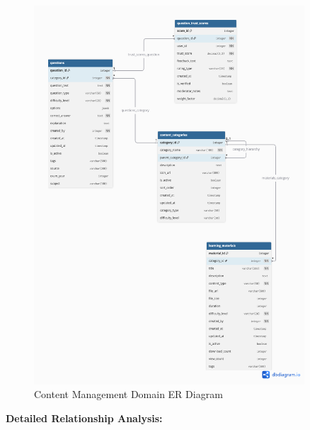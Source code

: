 \documentclass[12pt,a4paper,oneside]{book}
\begin{document}
\begin{figure}[H]
    \centering
    \includegraphics[width=0.9\textwidth]{assets/ER/Figure4.8.png}
    \caption{Content Management Domain ER Diagram}
    \label{fig:content_er}
\end{figure}

\textbf{Detailed Relationship Analysis:}
\end{document}
